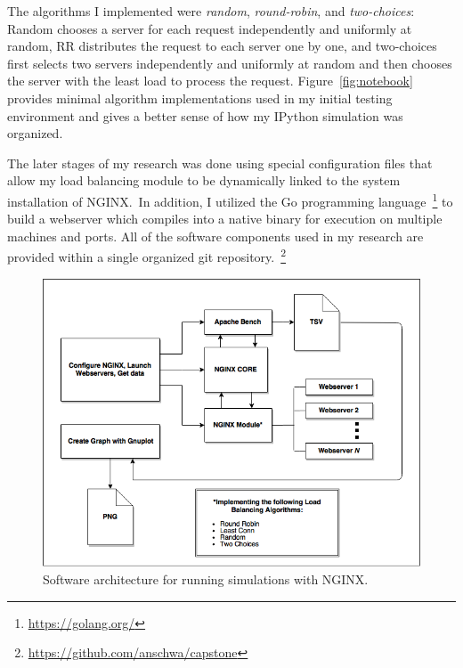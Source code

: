 The algorithms I implemented were \emph{random}, \emph{round-robin},
and \emph{two-choices}: Random chooses a server for each request
independently and uniformly at random, RR distributes the request to
each server one by one, and two-choices first selects two servers
independently and uniformly at random and then chooses the server with
the least load to process the request. Figure~\ref{fig:notebook}
provides minimal algorithm implementations used in my initial testing
environment and gives a better sense of how my IPython simulation was
organized.

The later stages of my research was done using special configuration
files that allow my load balancing module to be dynamically linked to
the system installation of NGINX.\ In addition, I utilized the Go
programming language~\footnote{\url{https://golang.org/}} to build a
webserver which compiles into a native binary for execution on
multiple machines and ports. All of the software components used in my
research are provided within a single organized git
repository.~\footnote{\url{https://github.com/anschwa/capstone}}

\begin{figure}
  \includegraphics[width=\linewidth]{figures/software.png}
  \caption{Software architecture for running simulations with NGINX.}
\label{fig:software}
\end{figure}

